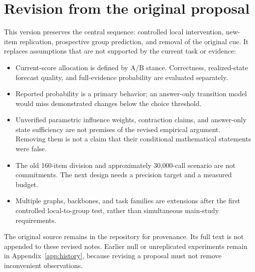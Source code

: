 \documentclass[11pt]{article}
\begin{document}
\section{Revision from the original proposal}
This version preserves the central sequence: controlled local intervention, new-item replication, prospective group prediction, and removal of the original cue. It replaces assumptions that are not supported by the current task or evidence:
\begin{itemize}
\item Current-score allocation is defined by A/B stance. Correctness, realized-state forecast quality, and full-evidence probability are evaluated separately.
\item Reported probability is a primary behavior; an answer-only transition model would miss demonstrated changes below the choice threshold.
\item Unverified parametric influence weights, contraction claims, and answer-only state sufficiency are not premises of the revised empirical argument. Removing them is not a claim that their conditional mathematical statements were false.
\item The old 160-item division and approximately 30,000-call scenario are not commitments. The next design needs a precision target and a measured budget.
\item Multiple graphs, backbones, and task families are extensions after the first controlled local-to-group test, rather than simultaneous main-study requirements.
\end{itemize}
The original source remains in the repository for provenance. Its full text is not appended to these revised notes. Earlier null or unreplicated experiments remain in Appendix~\ref{app:history}, because revising a proposal must not remove inconvenient observations.
\end{document}
